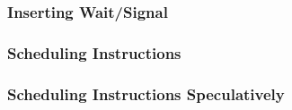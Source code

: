 \subsubsection{Inserting Wait/Signal}


\subsubsection{Scheduling Instructions}


\subsubsection{Scheduling Instructions Speculatively}







